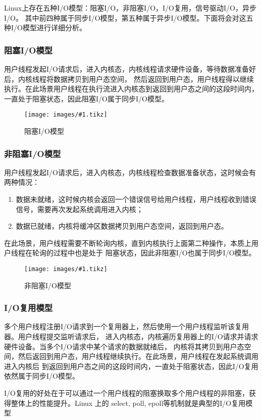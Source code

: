 \documentclass[supercite]{HustGraduPaper}
\newcommand{\cfig}[3]{
  \begin{figure}[htb]
    \centering
    \texttt{[image: images/\#1.tikz]}
    \caption{#3}
    \label{fig:#1}
  \end{figure}
}
\theoremstyle{definition}
\begin{document}
Linux上存在五种I/O模型：阻塞I/O，非阻塞I/O，I/O复用，信号驱动I/O，异步I/O。
其中前四种属于同步I/O模型，第五种属于异步I/O模型。下面将会对这五种I/O模型进行详细分析。\par

\subsubsection{阻塞I/O模型}
用户线程发起I/O请求后，进入内核态，内核线程请求硬件设备，等待数据准备好后，内核线程将数据拷贝到用户态空间，
然后返回到用户态，用户线程得以继续执行。在此场景用户线程在执行流进入内核态到返回到用户态之间的这段时间内，
一直处于阻塞状态，因此阻塞I/O属于同步I/O模型。\par

\cfig{block-io}{0.5}{阻塞I/O模型}

\subsubsection{非阻塞I/O模型}
用户线程发起I/O请求后，进入内核态，内核线程检查数据准备状态，这时候会有两种情况：
\begin{enumerate}
  \item 数据未就绪，这时候内核会返回一个错误信号给用户线程，用户线程收到错误信号，需要再次发起系统调用进入内核；
  \item 数据已就绪，内核将缓冲区数据拷贝到用户态空间，返回到用户态。
\end{enumerate}

在此场景，用户线程需要不断轮询内核，直到内核执行上面第二种操作，本质上用户线程在轮询的过程中也是处于
阻塞状态，因此非阻塞I/O也属于同步I/O模型。\par

\cfig{nonblock-io}{0.5}{非阻塞I/O模型}

\subsubsection{I/O复用模型}
多个用户线程注册I/O请求到一个复用器上，然后使用一个用户线程监听该复用器。用户线程提交监听请求后，
进入内核态，内核遍历复用器上的I/O请求并请求硬件设备。当多个I/O请求中某个请求的数据就绪后，
内核将其拷贝到用户态空间，然后返回到用户态，用户线程继续执行。在此场景，用户线程在发起系统调用进入内核后
到返回到用户态之间的这段时间内，一直处于阻塞状态，因此I/O复用依然属于同步I/O模型。\par

I/O复用的好处在于可以通过一个用户线程的阻塞换取多个用户线程的非阻塞，获得整体上的性能提升。Linux 上的
select, poll, epoll等机制就是典型的I/O复用模型\par
\end{document}
